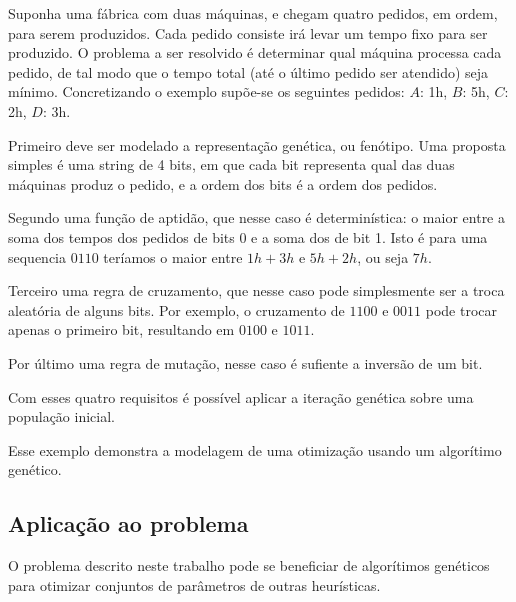 Suponha uma fábrica com duas máquinas, e chegam quatro pedidos, em ordem, para serem produzidos.
Cada pedido consiste irá levar um tempo fixo para ser produzido.
O problema a ser resolvido é determinar qual máquina processa cada pedido, de tal modo que
o tempo total (até o último pedido ser atendido) seja mínimo.
Concretizando o exemplo supõe-se os seguintes pedidos: $A$: 1h, $B$: 5h, $C$: 2h, $D$: 3h.

Primeiro deve ser modelado a representação genética, ou fenótipo.
Uma proposta simples é uma string de 4 bits, em que cada bit representa qual das duas máquinas produz
o pedido, e a ordem dos bits é a ordem dos pedidos.

Segundo uma função de aptidão, que nesse caso é determinística: o maior entre a soma dos tempos dos pedidos
de bits 0 e a soma dos de bit 1. Isto é para uma sequencia $0110$ teríamos o maior entre $1h + 3h$ e $5h + 2h$,
ou seja $7h$.

Terceiro uma regra de cruzamento, que nesse caso pode simplesmente ser a troca aleatória de alguns bits.
Por exemplo, o cruzamento de $1100$ e $0011$ pode trocar apenas o primeiro bit, resultando em $0100$ e $1011$.

Por último uma regra de mutação, nesse caso é sufiente a inversão de um bit.

Com esses quatro requisitos é possível aplicar a iteração genética sobre uma população inicial.

Esse exemplo demonstra a modelagem de uma otimização usando um algorítimo genético.


\subsection{Aplicação ao problema}

O problema descrito neste trabalho pode se beneficiar de algorítimos genéticos para otimizar conjuntos de
parâmetros de outras heurísticas.
